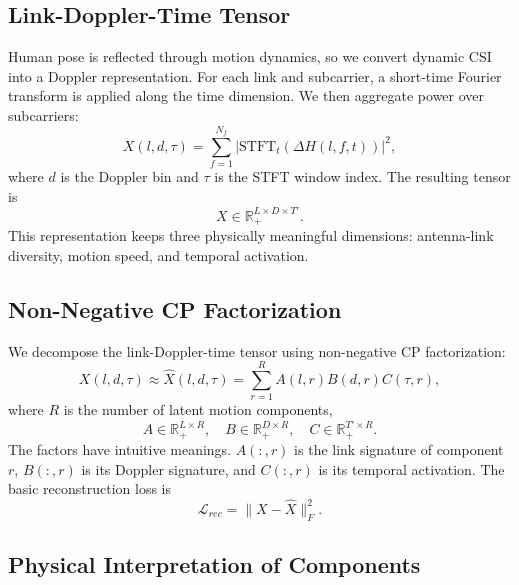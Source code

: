 \documentclass[10pt,journal]{IEEEtran}
\begin{document}
\subsection{Link-Doppler-Time Tensor}

Human pose is reflected through motion dynamics, so we convert dynamic CSI into a Doppler representation. For each link and subcarrier, a short-time Fourier transform is applied along the time dimension. We then aggregate power over subcarriers:
\begin{equation}
    X(l,d,\tau)
    =
    \sum_{f=1}^{N_f}
    \left|
    \mathrm{STFT}_t(\Delta H(l,f,t))
    \right|^2,
    \label{eq:ldt_tensor}
\end{equation}
where $d$ is the Doppler bin and $\tau$ is the STFT window index. The resulting tensor is
\begin{equation}
    X\in\mathbb{R}_{+}^{L\times D\times T'}.
\end{equation}
This representation keeps three physically meaningful dimensions: antenna-link diversity, motion speed, and temporal activation.

\subsection{Non-Negative CP Factorization}

We decompose the link-Doppler-time tensor using non-negative CP factorization:
\begin{equation}
    X(l,d,\tau)
    \approx
    \hat{X}(l,d,\tau)
    =
    \sum_{r=1}^{R}
    A(l,r)B(d,r)C(\tau,r),
    \label{eq:cp}
\end{equation}
where $R$ is the number of latent motion components,
\begin{equation}
    A\in\mathbb{R}_{+}^{L\times R},\quad
    B\in\mathbb{R}_{+}^{D\times R},\quad
    C\in\mathbb{R}_{+}^{T'\times R}.
\end{equation}
The factors have intuitive meanings. $A(:,r)$ is the link signature of component $r$, $B(:,r)$ is its Doppler signature, and $C(:,r)$ is its temporal activation. The basic reconstruction loss is
\begin{equation}
    \mathcal{L}_{rec}=\|X-\hat{X}\|_F^2.
\end{equation}

\subsection{Physical Interpretation of Components}
\end{document}
